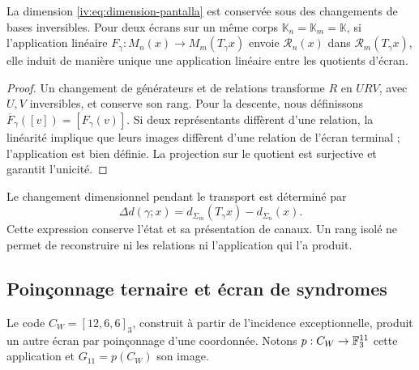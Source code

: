 \begin{proposition}
\label{iv:prop:pantalla-transporte}
La dimension \eqref{iv:eq:dimension-pantalla} est conservée
sous des changements de bases inversibles. Pour deux écrans sur un même corps
\(\mathbb K_n=\mathbb K_m=\mathbb K\), si l’application linéaire
\(F_\gamma:M_n(x)\to M_m(T_\gamma x)\) envoie
\(\mathcal R_n(x)\) dans \(\mathcal R_m(T_\gamma x)\), elle induit
de manière unique une application linéaire entre les quotients d’écran.
\end{proposition}
\begin{proof}
Un changement de générateurs et de relations transforme \(R\) en
\(URV\), avec \(U,V\) inversibles, et conserve son rang. Pour
la descente, nous définissons
\(\overline F_\gamma([v])=[F_\gamma(v)]\). Si deux
représentants diffèrent d’une relation, la linéarité implique que leurs images diffèrent
d’une relation de l’écran terminal ; l’application est
bien définie. La projection sur le quotient est surjective et
garantit l’unicité.

\end{proof}

Le changement dimensionnel pendant le transport est déterminé
par
\[
 \Delta d(\gamma;x)=d_{\Sigma_m}(T_\gamma x)
                         -d_{\Sigma_n}(x).
\]
Cette expression conserve l’état et sa présentation de canaux.
Un rang isolé ne permet de reconstruire ni les relations ni
l’application qui l’a produit.

\subsection{Poinçonnage ternaire et écran de syndromes}

Le code \(C_W=[12,6,6]_3\), construit à partir de
l’incidence exceptionnelle, produit un autre écran par
poinçonnage d’une coordonnée. Notons
\(p:C_W\to\mathbb F_3^{11}\) cette application et
\(G_{11}=p(C_W)\) son image.

